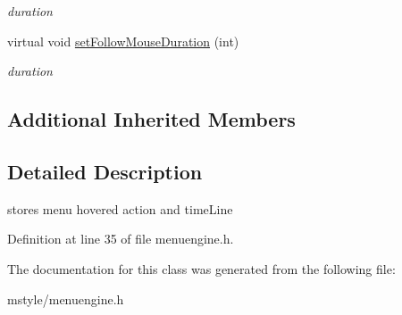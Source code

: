 \begin{DoxyCompactItemize}
\begin{DoxyCompactList}\small\item\em duration \end{DoxyCompactList}\item 
\mbox{\label{class_menu_base_engine_a9b0a5bea75f1dd7090b267422d9172d6}} 
virtual void \hyperlink{class_menu_base_engine_a9b0a5bea75f1dd7090b267422d9172d6}{set\+Follow\+Mouse\+Duration} (int)
\begin{DoxyCompactList}\small\item\em duration \end{DoxyCompactList}\end{DoxyCompactItemize}
\subsection*{Additional Inherited Members}


\subsection{Detailed Description}
stores menu hovered action and time\+Line 

Definition at line 35 of file menuengine.\+h.



The documentation for this class was generated from the following file\+:\begin{DoxyCompactItemize}
\item 
mstyle/menuengine.\+h\end{DoxyCompactItemize}

